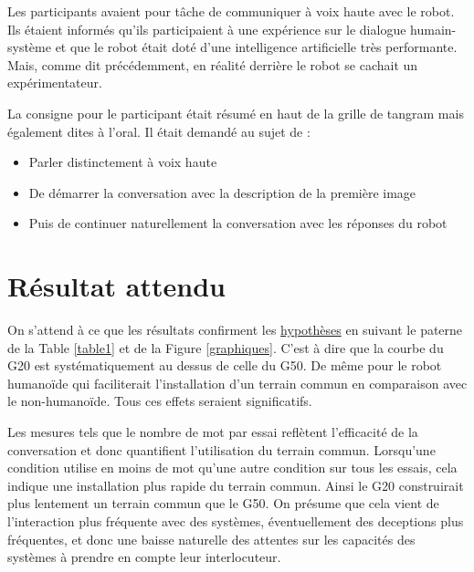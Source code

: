 \documentclass{article}
\begin{document}
Les participants avaient pour tâche de communiquer à voix haute avec le robot. Ils étaient informés qu'ils participaient à une expérience sur le dialogue humain-système et que le robot était doté d'une intelligence artificielle très performante. Mais, comme dit précédemment, en réalité derrière le robot se cachait un expérimentateur. 

La consigne pour le participant était résumé en haut de la grille de tangram mais également dites à l'oral. Il était demandé au sujet de :
\begin{itemize}
    \item Parler distinctement à voix haute
    \item De démarrer la conversation avec la description de la première image
    \item Puis de continuer naturellement la conversation avec les réponses du robot
\end{itemize}  

\section{Résultat attendu}
On s'attend à ce que les résultats confirment les \hyperlink{HP}{hypothèses} en suivant le paterne de la Table \ref{table1} et de la Figure \ref{graphiques}. C'est à dire que la courbe du G20 est systématiquement au dessus de celle du G50. De même pour le robot humanoïde qui faciliterait l'installation d'un terrain commun en comparaison avec le non-humanoïde. Tous ces effets seraient significatifs.

Les mesures tels que le nombre de mot par essai reflètent l'efficacité de la conversation et donc quantifient l'utilisation du terrain commun. Lorsqu'une condition utilise en moins de mot qu'une autre condition sur tous les essais, cela indique une installation plus rapide du terrain commun. Ainsi le G20 construirait plus lentement un terrain commun que le G50. On présume que cela vient de l'interaction plus fréquente avec des systèmes, éventuellement des deceptions plus fréquentes, et donc une baisse naturelle des attentes sur les capacités des systèmes à prendre en compte leur interlocuteur.
\end{document}
